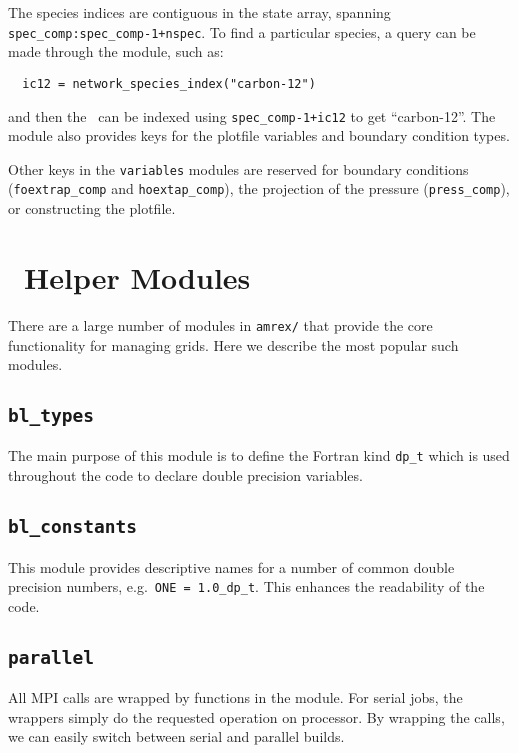 The species indices are contiguous in the state array, spanning {\tt
  spec\_comp:spec\_comp-1+nspec}.  To find a particular species, a
query can be made through the  module, such as:
\begin{verbatim}
  ic12 = network_species_index("carbon-12")
\end{verbatim}
and then the \fab\ can be indexed using {\tt spec\_comp-1+ic12} to
get ``carbon-12''.
The  module also provides keys for the plotfile
variables and boundary condition types.

Other keys in the {\tt variables} modules are reserved for boundary
conditions ({\tt foextrap\_comp} and {\tt hoextap\_comp}), the
projection of the pressure ({\tt press\_comp}), or constructing
the plotfile.


\section{\amrex\ Helper Modules}

There are a large number of modules in {\tt amrex/} that provide
the core functionality for managing grids.  Here we describe
the most popular such modules.


\subsection{{\tt bl\_types}}

The main purpose of this module is to define the Fortran kind {\tt dp\_t}
which is used throughout the code to declare double precision variables.

\subsection{{\tt bl\_constants}}

This module provides descriptive names for a number of common double precision
numbers, e.g.\ {\tt ONE = 1.0\_dp\_t}.  This enhances the readability of
the code.

\subsection{{\tt parallel}}

All MPI calls are wrapped by functions in the  module.  For
serial jobs, the wrappers simply do the requested operation on processor.
By wrapping the calls, we can easily switch between serial and parallel
builds.

